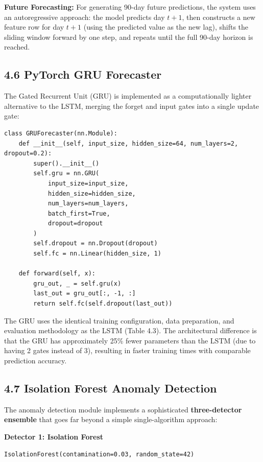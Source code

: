 \documentclass[12pt, a4paper]{report}
\begin{document}
\textbf{Future Forecasting:}
For generating 90-day future predictions, the system uses an autoregressive approach: the model predicts day $t+1$, then constructs a new feature row for day $t+1$ (using the predicted value as the new lag), shifts the sliding window forward by one step, and repeats until the full 90-day horizon is reached.

\subsection{4.6 PyTorch GRU Forecaster}

The Gated Recurrent Unit (GRU) is implemented as a computationally lighter alternative to the LSTM, merging the forget and input gates into a single update gate:

\begin{verbatim}
class GRUForecaster(nn.Module):
    def __init__(self, input_size, hidden_size=64, num_layers=2, dropout=0.2):
        super().__init__()
        self.gru = nn.GRU(
            input_size=input_size,
            hidden_size=hidden_size,
            num_layers=num_layers,
            batch_first=True,
            dropout=dropout
        )
        self.dropout = nn.Dropout(dropout)
        self.fc = nn.Linear(hidden_size, 1)

    def forward(self, x):
        gru_out, _ = self.gru(x)
        last_out = gru_out[:, -1, :]
        return self.fc(self.dropout(last_out))
\end{verbatim}

The GRU uses the identical training configuration, data preparation, and evaluation methodology as the LSTM (Table 4.3). The architectural difference is that the GRU has approximately 25\% fewer parameters than the LSTM (due to having 2 gates instead of 3), resulting in faster training times with comparable prediction accuracy.

\subsection{4.7 Isolation Forest Anomaly Detection}

The anomaly detection module implements a sophisticated \textbf{three-detector ensemble} that goes far beyond a simple single-algorithm approach:

\textbf{Detector 1: Isolation Forest}
\begin{verbatim}
IsolationForest(contamination=0.03, random_state=42)
\end{verbatim}
\end{document}
